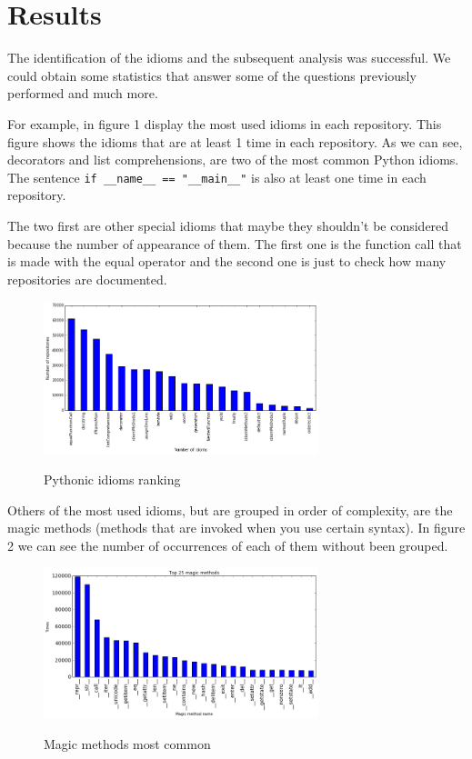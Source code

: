 \documentclass[conference]{IEEEtran}
\begin{document}
\section{Results}

The identification of the idioms and the subsequent analysis was successful. We could obtain some statistics that answer some of the questions previously performed and much more.

For example, in figure 1 display the most used idioms in each repository. This figure shows the idioms that are at least 1 time in each repository. As we can see, decorators and list comprehensions, are two of the most common Python idioms. The sentence \verb|if __name__ == "__main__"| is also at least one time in each repository.

The two first are other special idioms that maybe they shouldn't be considered because the number of appearance of them. The first one is the function call that is made with the equal operator and the second one is just to check how many repositories are documented.

\begin{figure}[ht]
\centering
\includegraphics[width=80mm]{img/num_idiom_repo.png}
\label{fig:idiom_ranking}
\caption{Pythonic idioms ranking}
\end{figure}

Others of the most used idioms, but are grouped in order of complexity, are the magic methods (methods that are invoked when you use certain syntax). In figure 2 we can see the number of occurrences of each of them without been grouped. 

\begin{figure}[ht]
\centering
\includegraphics[width=80mm]{img/magic_methods.png}
\label{fig:magic_ranking}
\caption{Magic methods most common}
\end{figure}
\end{document}
